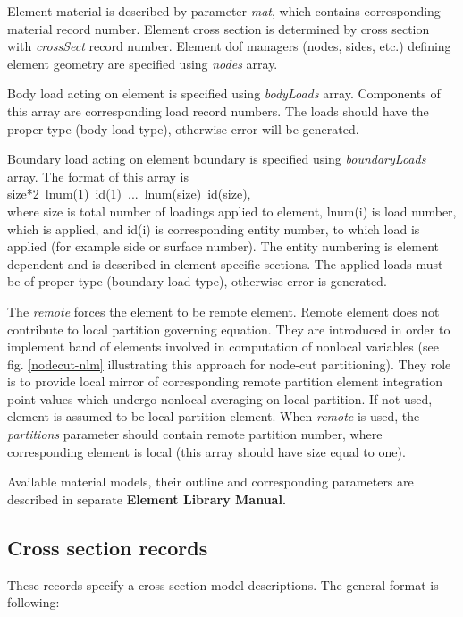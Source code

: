 \documentclass[a4paper]{article}
\newcommand{\param}[1]{{\em #1}}
\newcommand{\Pmode}[1]{{\sffamily #1}}
\begin{document}
Element
material is described by parameter \param{mat}, which contains corresponding
material record number. Element cross
section is determined by cross section  with  \param{crossSect}
record number. Element dof managers (nodes, sides, etc.) defining element geometry are specified using
\param{nodes} array.

Body load acting on element is specified using \param{bodyLoads} array. Components
of this array are corresponding load record numbers. The loads should
have the proper type (body load type), otherwise error will be generated.

Boundary load acting on element boundary is specified using
\param{boundaryLoads} array. The format of this array is\\
size*2~lnum(1)~id(1)~...~lnum(size)~id(size),\\
where size is total number of loadings applied to element,
lnum(i) is load number, which is applied, and id(i)
is corresponding entity number, to which load is applied (for example
side or surface number). The entity numbering is element dependent and
is described in element specific sections. The applied loads must be
of proper type (boundary load type), otherwise error is generated. 

\Pmode{
The \param{remote} forces the element to be remote element. Remote
element does not contribute to local partition governing equation.
They are introduced in order to implement band of elements involved
in computation of nonlocal variables (see fig. \ref{nodecut-nlm} illustrating
this approach for node-cut partitioning). They role is to provide
local mirror of corresponding remote partition element integration point values which undergo
nonlocal averaging on local partition. 
If not used, element is assumed to be local partition element.
When \param{remote} is used, the \param{partitions} parameter should 
contain remote partition number, where
corresponding element is local (this array should have size equal to one).
}


Available material models, their outline and
corresponding parameters are described in separate {\bf Element Library Manual.}

\subsection{Cross section records}
\label{_CrossSectionRecords}
These records specify a cross section model descriptions. The general format is
following:
\end{document}
